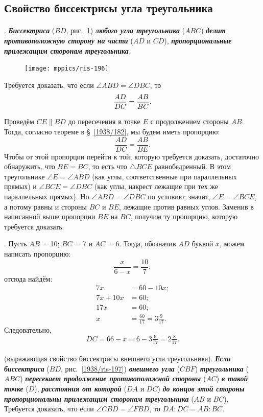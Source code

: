 \documentclass[twoside]{book}
\begin{document}
\subsection*{Свойство биссектрисы угла треугольника}

\paragraph{}\label{1938/186}
.
\textbf{\emph{Биссектриса}} ($BD$, рис.~\ref{1938/ris-196}) \textbf{\emph{любого угла треугольника}} ($ABC$) \textbf{\emph{делит противоположную сторону на части}} ($AD$ и $CD$), \textbf{\emph{пропорциональные прилежащим сторонам треугольника.}}

\begin{figure}
\centering
\texttt{[image: mppics/ris-196]}
\caption{}\label{1938/ris-196}
\end{figure}

Требуется доказать, что если $\angle ABD=\angle DBC$, то 
\[\frac{AD}{DC}\z=\frac{AB}{BC}.\]

Проведём $CE \parallel BD$ до пересечения в точке $E$ с продолжением стороны $AB$.
Тогда, согласно теореме в §~\ref{1938/182}, мы будем иметь пропорцию:
\[\frac{AD}{DC}=\frac{AB}{BE}.\]
Чтобы от этой пропорции перейти к той, которую требуется доказать, достаточно обнаружить, что $BE=BC$, то есть что $\triangle BCE$ равнобедренный.
В этом треугольнике $\angle E=\angle ABD$ (как углы, соответственные при параллельных прямых) и $\angle BCE = \angle DBC$ (как углы, накрест лежащие при тех же параллельных прямых).
Но $\angle ABD=\angle DBC$ по условию;
значит, $\angle E = \angle BCE$, а потому равны и стороны $BC$ и $BE$, лежащие против равных углов.
Заменив в написанной выше пропорции $BE$ на $BC$, получим ту пропорцию, которую требуется доказать.

\medskip

\smallskip
{}.
Пусть $AB$ = 10;
$BC$ = 7 и $AC$ = 6.
Тогда, обозначив $AD$ буквой $x$, можем написать пропорцию:
\[\frac{x}{6 - x} = \frac{10}7;\]
отсюда найдём:
\begin{align*}
7x&=60-10x;
\\
7x+10x&=60;
\\
17x&=60;
\\
x&=\tfrac{60}{17}=3\tfrac9{17}.
\end{align*}
Следовательно,
\[DC=66-x=6-3\tfrac9{17}=2\tfrac8{17}.\]

\paragraph{}\label{1938/187}
 (выражающая свойство биссектрисы внешнего угла треугольника).
\textbf{\emph{Если биссектриса}} ($BD$, рис.~\ref{1938/ris-197}) \textbf{\emph{внешнего угла}} ($CBF$) \textbf{\emph{треугольника}} ($ABC$) \textbf{\emph{пересекает продолжение противоположной стороны}} ($AC$) \textbf{\emph{в такой точке}} ($D$), \textbf{\emph{расстояния от которой}} ($DA$ и $DC$) \textbf{\emph{до концов этой стороны пропорциональны прилежащим сторонам треугольника}} ($AB$ и $BC$).
Требуется доказать, что если $\angle CBD=\angle FBD$, то $DA:DC=AB:BC$.
\end{document}
